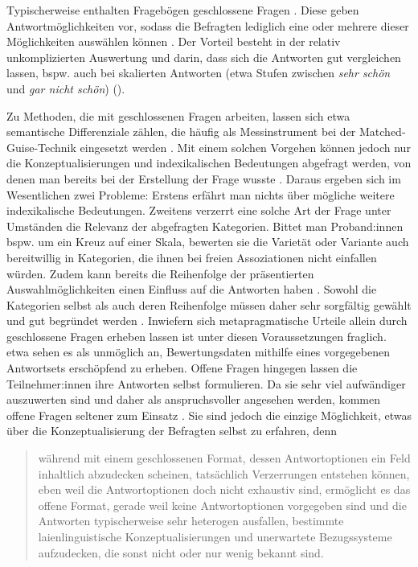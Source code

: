 Typischerweise enthalten Fragebögen geschlossene Fragen \citep[s.][181]{Studler.2014}.
Diese geben Antwortmöglichkeiten vor, sodass die Befragten lediglich eine oder mehrere dieser Möglichkeiten auswählen können \citep[s.][55]{Porst2014}.
Der Vorteil besteht in der relativ unkomplizierten Auswertung und darin, dass sich die Antworten gut vergleichen lassen, bspw. auch bei skalierten Antworten (etwa Stufen zwischen \textit{sehr schön} und \textit{gar nicht schön}) (\cites[s.][215]{Garrett.2004}[74]{Adler.2018}). 

Zu Methoden, die mit geschlossenen Fragen arbeiten, lassen sich etwa semantische Differenziale zählen, die häufig als Messinstrument bei der Matched-Guise-Technik eingesetzt werden \citep[s.][13]{Hundt.1992}.
Mit einem solchen Vorgehen können jedoch nur die Konzeptualisierungen und indexikalischen Bedeutungen abgefragt werden, von denen man bereits bei der Erstellung der Frage wusste \citep[s.][196]{Garrett.2004}. 
Daraus ergeben sich im Wesentlichen zwei Probleme: Erstens erfährt man nichts über mögliche weitere indexikalische Bedeutungen. 
Zweitens verzerrt eine solche Art der Frage unter Umständen die Relevanz der abgefragten Kategorien.  
Bittet man Proband:innen bspw. um ein Kreuz auf einer Skala, bewerten sie die Variet{\"a}t oder Variante auch bereitwillig in Kategorien, die ihnen bei freien Assoziationen nicht einfallen würden.  
Zudem kann bereits die Reihenfolge der präsentierten Auswahlmöglichkeiten einen Einfluss auf die Antworten haben \citep[s.][138]{Porst2014}. 
Sowohl die Kategorien selbst als auch deren Reihenfolge müssen daher sehr sorgfältig gewählt und gut begründet werden \citep[s.][70]{Adler.2018}.
Inwiefern sich metapragmatische Urteile allein durch geschlossene Fragen erheben lassen ist unter diesen Voraussetzungen fraglich.
\citet[216]{Garrett.2004} etwa sehen es als unmöglich an, Bewertungsdaten mithilfe eines vorgegebenen Antwortsets erschöpfend zu erheben. 
Offene Fragen hingegen lassen die Teilnehmer:innen ihre Antworten selbst formulieren. 
Da sie sehr viel aufwändiger auszuwerten sind und daher als anspruchsvoller angesehen werden, kommen offene Fragen seltener zum Einsatz \citep[s.][70--71]{Adler.2018}. 
Sie sind jedoch die einzige Möglichkeit, etwas über die Konzeptualisierung der Befragten selbst zu erfahren, denn
\begin{quote}während mit einem geschlossenen Format, dessen Antwortoptionen ein Feld inhaltlich abzudecken scheinen, tatsächlich Verzerrungen entstehen können, eben weil die Antwortoptionen doch nicht exhaustiv sind, ermöglicht es das offene Format, gerade weil keine Antwortoptionen vorgegeben sind und die Antworten typischerweise sehr heterogen ausfallen, bestimmte laienlinguistische Konzeptualisierungen und unerwartete Bezugssysteme aufzudecken, die sonst nicht oder nur wenig bekannt sind. \citep[71]{Adler.2018}\end{quote}
